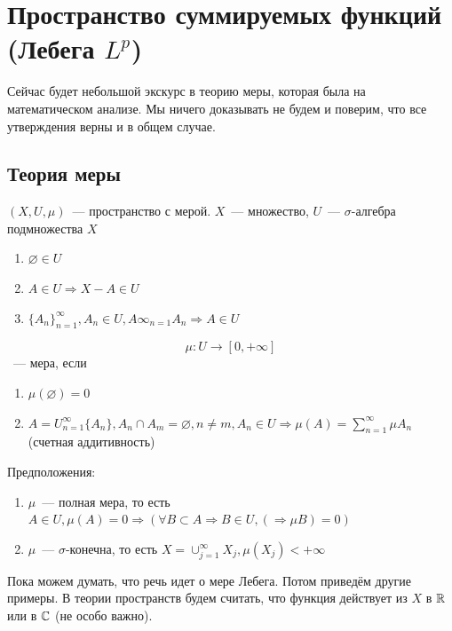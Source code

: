 \documentclass[document]{subfiles}
\begin{document}
\chapter[Пространство суммируемых функций (Лебега $L^p$)][Пространство Лебега]{Пространство суммируемых функций (Лебега $L^p$)}
Сейчас будет небольшой экскурс в теорию меры, которая была на математическом анализе. Мы ничего доказывать не будем и поверим, что все утверждения верны и в общем случае.
\section{Теория меры}
\begin{definition}[Мера]
    $(X, U, \mu)$~--- пространство с мерой. $X$~--- множество, $U$~--- $\sigma$-алгебра подмножества $X$
    \begin{enumerate}
        \item $\varnothing \in U$
        \item $A \in U \Rightarrow X - A \in U$
        \item $\{ A_n\}^\infty_{n=1}, A_n \in U, A\infty_{n=1} A_n \Rightarrow A \in U$
    \end{enumerate}
    \[ \mu : U \rightarrow [0, +\infty] \]~--- мера, если
    \begin{enumerate}
        \item $\mu(\varnothing) = 0$
        \item $ A = U^\infty_{n=1} \{A_n\}, A_n \cap A_m = \varnothing, n \ne m, A_n \in U \Rightarrow \mu(A) = \sum^\infty_{n=1} \mu A_n$ (счетная аддитивность)
    \end{enumerate}
\end{definition}

Предположения: 
\begin{enumerate}
    \item $\mu$~--- полная мера, то есть $A \in U, \mu(A) = 0 \Rightarrow (\forall B \subset A \Rightarrow B \in U, (\Rightarrow \mu B) =0)$
    \item $\mu$~--- $\sigma$-конечна, то есть $X = \cup^\infty_{j=1} X_j, \mu(X_j) < + \infty$
\end{enumerate}
Пока можем думать, что речь идет о мере Лебега. Потом приведём другие примеры.
В теории пространств будем считать, что функция действует из $X$ в $\mathbb{R}$ или в $\mathbb{C}$ (не особо важно).
\end{document}
